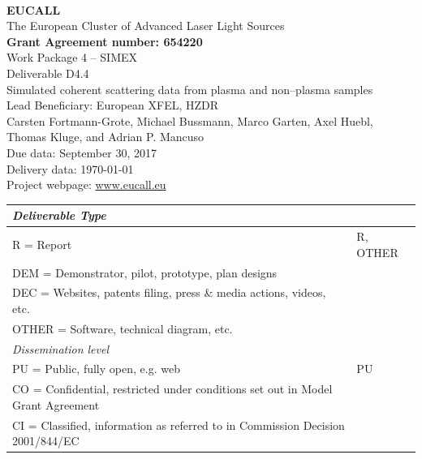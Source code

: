 \documentclass[10pt]{scrartcl}
\begin{document}
\makeatletter
\begin{titlepage}
\thispagestyle{scrheadings}
\begin{center}
$~$\\
\vspace{0cm}
{\Large\textbf{EUCALL}\\[2ex]
The European Cluster of Advanced Laser Light Sources}\\[4ex]
%
{\small\textbf{Grant Agreement number: 654220}}\\[8ex]
%
Work Package 4 -- SIMEX\\[4ex]
%
Deliverable D4.4\\
%
Simulated coherent scattering data from plasma and non--plasma samples\\[5ex]
%
Lead Beneficiary: European XFEL, HZDR\\[5ex]
%
Carsten Fortmann-Grote, Michael Bussmann,
  Marco Garten, Axel Huebl, Thomas Kluge,
  and Adrian P. Mancuso\\[4ex]
%
Due data: September 30, 2017\\
Delivery data: \today \\[4ex]
%
Project webpage: \url{www.eucall.eu}\\[6ex]
%
{%
\small
\begin{tabular}{|l|l|}
  \hline
  \multicolumn{2}{|l|}{ \textit{Deliverable Type} } \\
  \hline
  R = Report\hfill & R, OTHER \\
  DEM = Demonstrator, pilot, prototype, plan designs & \\
  DEC = Websites, patents filing, press \& media actions, videos, etc. & \\
  OTHER = Software, technical diagram, etc. & \\
  \hline
  \multicolumn{2}{|l|}{\textit{Dissemination level}} \\
  \hline
  PU = Public, fully open, e.g. web & PU \\
  CO = Confidential, restricted under conditions set out in Model Grant
  Agreement\hspace*{17ex}\  & \\
  CI = Classified, information as referred to in Commission Decision 2001/844/EC
  & \\
  \hline
\end{tabular}
}

\end{center}
%
{}
\normalfont
\end{titlepage}
\makeatother
\end{document}
